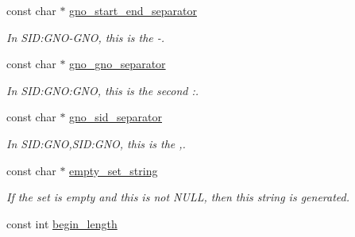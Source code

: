 \begin{DoxyCompactItemize}
const char $\ast$ \mbox{\hyperlink{structGtid__set_1_1String__format_ad2a1f82538d7a3e734510f74713ed3fd}{gno\+\_\+start\+\_\+end\+\_\+separator}}
\begin{DoxyCompactList}\small\item\em In \textquotesingle{}S\+ID\+:G\+NO-\/G\+NO\textquotesingle{}, this is the \textquotesingle{}-\/\textquotesingle{}. \end{DoxyCompactList}\item 
\mbox{\label{structGtid__set_1_1String__format_ab9b060e733a0078fa68045616c4b4893}} 
const char $\ast$ \mbox{\hyperlink{structGtid__set_1_1String__format_ab9b060e733a0078fa68045616c4b4893}{gno\+\_\+gno\+\_\+separator}}
\begin{DoxyCompactList}\small\item\em In \textquotesingle{}S\+I\+D\+:\+G\+NO\+:G\+NO\textquotesingle{}, this is the second \textquotesingle{}\+:\textquotesingle{}. \end{DoxyCompactList}\item 
\mbox{\label{structGtid__set_1_1String__format_a2ffa890483bc67c05f591ec476f449c4}} 
const char $\ast$ \mbox{\hyperlink{structGtid__set_1_1String__format_a2ffa890483bc67c05f591ec476f449c4}{gno\+\_\+sid\+\_\+separator}}
\begin{DoxyCompactList}\small\item\em In \textquotesingle{}S\+ID\+:G\+NO,S\+ID\+:G\+NO\textquotesingle{}, this is the \textquotesingle{},\textquotesingle{}. \end{DoxyCompactList}\item 
\mbox{\label{structGtid__set_1_1String__format_aa43febd91d066c1eb7d0fa050df2c7df}} 
const char $\ast$ \mbox{\hyperlink{structGtid__set_1_1String__format_aa43febd91d066c1eb7d0fa050df2c7df}{empty\+\_\+set\+\_\+string}}
\begin{DoxyCompactList}\small\item\em If the set is empty and this is not N\+U\+LL, then this string is generated. \end{DoxyCompactList}\item 
\mbox{\label{structGtid__set_1_1String__format_a1d5f76899ce6b276d3f98b28e73efe6c}} 
const int \mbox{\hyperlink{structGtid__set_1_1String__format_a1d5f76899ce6b276d3f98b28e73efe6c}{begin\+\_\+length}}

\end{DoxyCompactItemize}
